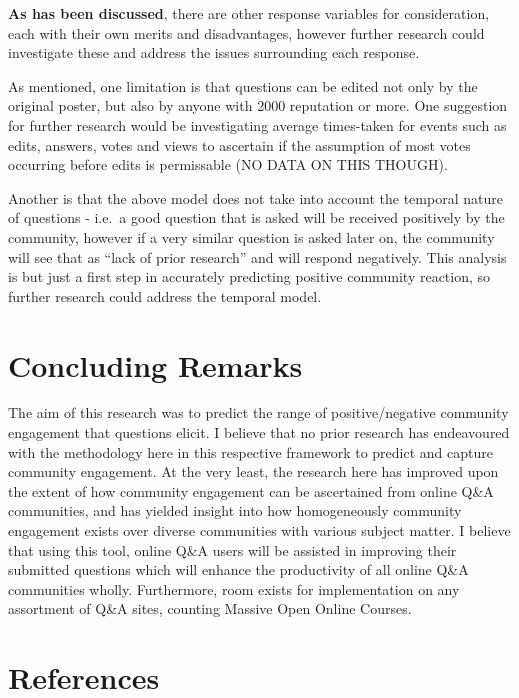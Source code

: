 \documentclass[11pt,preprint, authoryear]{article}
\numberwithin{equation}{section}
\begin{document}
\textbf{As has been discussed}, there are other response variables for
consideration, each with their own merits and disadvantages, however
further research could investigate these and address the issues
surrounding each response.

As mentioned, one limitation is that questions can be edited not only by
the original poster, but also by anyone with 2000 reputation or more.
One suggestion for further research would be investigating average
times-taken for events such as edits, answers, votes and views to
ascertain if the assumption of most votes occurring before edits is
permissable (NO DATA ON THIS THOUGH).

Another is that the above model does not take into account the temporal
nature of questions - i.e.~a good question that is asked will be
received positively by the community, however if a very similar question
is asked later on, the community will see that as ``lack of prior
research'' and will respond negatively. This analysis is but just a
first step in accurately predicting positive community reaction, so
further research could address the temporal model.

\newpage

\section{\texorpdfstring{Concluding Remarks
\label{Concl}}{Concluding Remarks }}\label{concluding-remarks}

The aim of this research was to predict the range of positive/negative
community engagement that questions elicit. I believe that no prior
research has endeavoured with the methodology here in this respective
framework to predict and capture community engagement. At the very
least, the research here has improved upon the extent of how community
engagement can be ascertained from online Q\&A communities, and has
yielded insight into how homogeneously community engagement exists over
diverse communities with various subject matter. I believe that using
this tool, online Q\&A users will be assisted in improving their
submitted questions which will enhance the productivity of all online
Q\&A communities wholly. Furthermore, room exists for implementation on
any assortment of Q\&A sites, counting Massive Open Online Courses.

\newpage

\section*{References}
\end{document}
